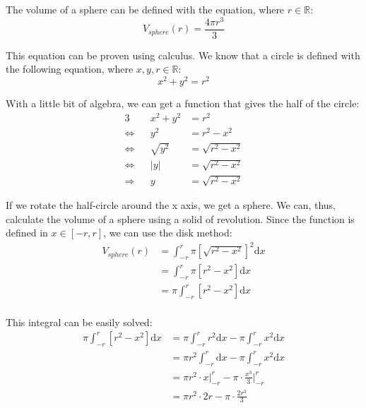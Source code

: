 \documentclass[11pt]{article}
\begin{document}

The volume of a sphere can be defined with the equation, where $r\in \mathbb{R}$:
\begin{equation*}
V_{sphere}(r)=\frac{4\pi r^{3}}{3}
\end{equation*}

This equation can be proven using calculus. We know that a circle is defined with the following equation, where $x,y,r\in \mathbb{R}$:
\begin{equation*}
x^{2}+y^{2}=r^{2}
\end{equation*}

With a little bit of algebra, we can get a function that gives the half of the circle:
\begin{alignat*}{3}
                & &      x^{2}+y^{2} &=      r^{2}       \\
\Leftrightarrow & &            y^{2} &=      r^{2}-x^{2} \\
\Leftrightarrow & &      \sqrt{y^{2}}&=\sqrt{r^{2}-x^{2}}\\
\Leftrightarrow & &  \left |y\right |&=\sqrt{r^{2}-x^{2}}\\
\Rightarrow     & &         y        &=\sqrt{r^{2}-x^{2}}
\end{alignat*}

If we rotate the half-circle around the x axis, we get a sphere. We can, thus, calculate the volume of a sphere using a solid of revolution. Since the function is defined in $x\in\left [-r, r\right ]$, we can use the disk method:
\begin{equation*}
\begin{split}
V_{sphere}(r)&=   \int_{-r}^{r}\pi\left [\sqrt{r^{2}-x^{2}}\right ]^{2}\mathrm dx\\
             &=   \int_{-r}^{r}\pi\left [      r^{2}-x^{2} \right ]    \mathrm dx\\
             &=\pi\int_{-r}^{r}   \left [      r^{2}-x^{2} \right ]    \mathrm dx\\
\end{split}
\end{equation*}

This integral can be easily solved:
\begin{equation*}
\begin{split}
\pi\int_{-r}^{r}\left [r^{2}-x^{2}\right ]\mathrm dx
&=\pi      \int_{-r}^{r}r^{2}\mathrm dx-\pi\int_{-r}^{r}x^{2}\mathrm dx\\
&=\pi r^{2}\int_{-r}^{r}     \mathrm dx-\pi\int_{-r}^{r}x^{2}\mathrm dx\\
&=\pi r^{2}\cdot x\biggr\rvert_{-r}^{r}-\pi\cdot \frac{x^{3}}{3}\biggr\rvert_{-r}^{r}\\
&=\pi r^{2}\cdot 2r-\pi\cdot \frac{2r^{3}}{3}
\end{split}
\end{equation*}
\end{document}
